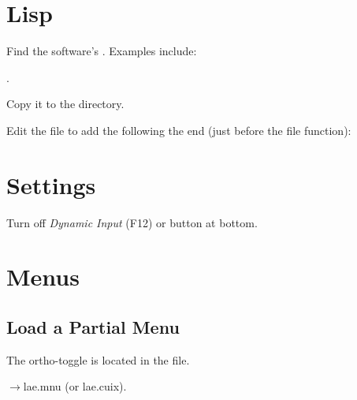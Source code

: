 \documentclass{lebook}
\newcommand*{\supportdir}{\textcode{\textit{support}}}
\begin{document}
\section{Lisp}
\begin{numberedlist}
    \item Find the software's .  Examples include:
    \begin{bulletedlist}
    	\item {}
    	\item {}.
    \end{bulletedlist}
    \item Copy it to the \supportdir{} directory.
    \item Edit the file to add the following the end (just before the file  function):
    \begin{plainlist}
    	\item {}
		\item {}
    \end{plainlist}

\end{numberedlist}


\section{Settings}
\begin{bulletedlist}
	\item Turn off \textit{Dynamic Input} (F12) or button at bottom.
\end{bulletedlist}


\section{Menus}
\subsection{Load a Partial Menu}
The  ortho-toggle is located in the  file.
\begin{bulletedlist}
	\item {}$\rightarrow$lae.mnu (or lae.cuix).
\end{bulletedlist}
\end{document}
